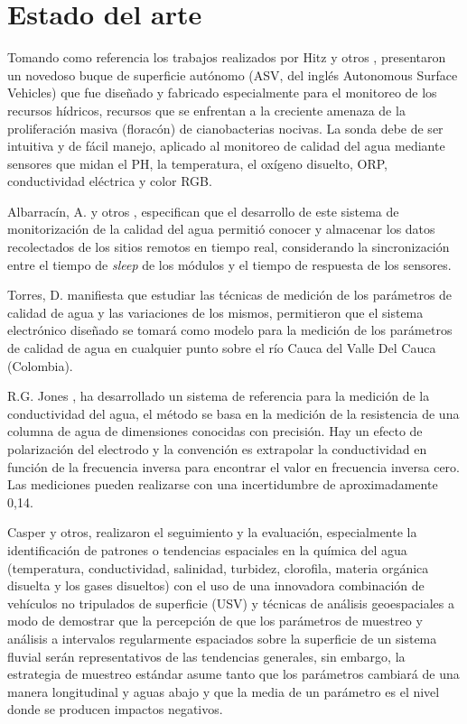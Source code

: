\section{Estado del arte}


Tomando como referencia los trabajos realizados por Hitz y otros \cite{hitz2012design}, presentaron un novedoso buque de superficie autónomo (ASV, del ingl\'es Autonomous Surface Vehicles) que fue dise\~nado y fabricado especialmente para el monitoreo de los recursos h\'idricos, recursos que se enfrentan a la creciente amenaza de la proliferaci\'on masiva (florac\'on) de cianobacterias nocivas. La sonda debe de ser intuitiva y de f\'acil manejo, aplicado al monitoreo de calidad del agua mediante sensores que midan el PH, la temperatura, el ox\'igeno disuelto,  ORP, conductividad el\'ectrica y color RGB. 

Albarrac\'in, A. y otros \cite{samaniegodevelopment}, especifican que el desarrollo de este sistema de monitorizaci\'on de la calidad del agua permiti\'o conocer y almacenar los datos recolectados de los sitios remotos en tiempo real, considerando la sincronizaci\'on entre el tiempo de \textit{sleep} de los m\'odulos y el tiempo de respuesta de los sensores. 

Torres, D. \cite{torres2009diseno} manifiesta que estudiar las t\'ecnicas de medici\'on de los par\'ametros de calidad de agua y las variaciones de los mismos, permitieron que el sistema electr\'onico dise\~nado se tomar\'a como modelo para la medici\'on de los par\'ametros de calidad de agua en cualquier punto sobre el río Cauca del Valle Del Cauca (Colombia).

R.G. Jones \cite{jones2002measurements}, ha desarrollado un sistema de referencia para la medici\'on de la conductividad del agua, el m\'etodo se basa en la medici\'on de la resistencia de una columna de agua de dimensiones conocidas con precisión. Hay un efecto de polarización del electrodo y la convención es extrapolar la conductividad en funci\'on de la frecuencia inversa para encontrar el valor en frecuencia inversa cero. Las mediciones pueden realizarse con una incertidumbre de aproximadamente 0,14.

Casper y otros\cite{casper2007combining}, realizaron el seguimiento y la evaluaci\'on, especialmente la identificaci\'on de patrones o tendencias espaciales en la qu\'imica del agua (temperatura, conductividad, salinidad, turbidez, clorofila, materia org\'anica disuelta y los gases disueltos) con el uso de una innovadora combinaci\'on de veh\'iculos no tripulados de superficie (USV) y t\'ecnicas de an\'alisis geoespaciales a modo de demostrar que la percepci\'on de que los par\'ametros de muestreo y an\'alisis a intervalos regularmente espaciados sobre la superficie de un sistema fluvial ser\'an representativos de las tendencias generales, sin embargo, la estrategia de muestreo est\'andar asume tanto que los par\'ametros cambiar\'a de una manera longitudinal y aguas abajo y que la media de un par\'ametro es el nivel donde se producen impactos negativos. 

